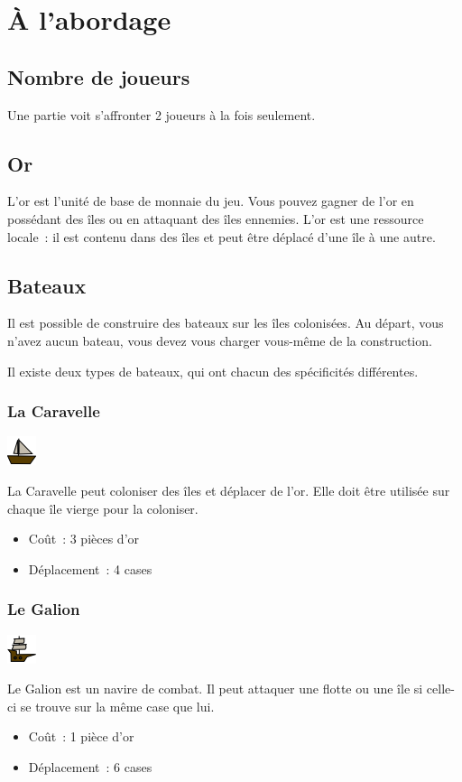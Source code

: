 
\section{À l'abordage}
\subsection{Nombre de joueurs}
Une partie voit s'affronter 2 joueurs à la fois seulement.

\subsection{Or}
L'or est l'unité de base de monnaie du jeu. Vous pouvez gagner de l'or en
possédant des îles ou en attaquant des îles ennemies.
L'or est une ressource locale~: il est contenu dans des îles et peut être
déplacé d'une île à une autre.

\subsection{Bateaux}
Il est possible de construire des bateaux sur les îles colonisées.
Au départ, vous n'avez aucun bateau, vous devez vous charger vous-même de la
construction.

Il existe deux types de bateaux, qui ont chacun des spécificités différentes.

\subsubsection{La Caravelle}
\begin{center}
\includegraphics{../gui/data/caravelle}
\end{center}
La Caravelle peut coloniser des îles et déplacer de l'or. Elle doit être
utilisée sur chaque île vierge pour la coloniser.
\begin{itemize}
	\item Coût~: 3 pièces d'or
	\item Déplacement~: 4 cases
\end{itemize}

\subsubsection{Le Galion}
\begin{center}
\includegraphics{../gui/data/galion}
\end{center}
Le Galion est un navire de combat. Il peut attaquer une flotte ou une île si
celle-ci se trouve sur la même case que lui.
\begin{itemize}
	\item Coût~: 1 pièce d'or
	\item Déplacement~: 6 cases
\end{itemize}

